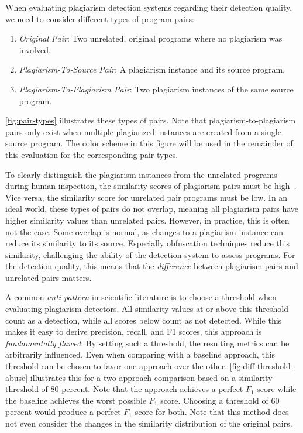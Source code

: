 When evaluating plagiarism detection systems regarding their detection quality, we need to consider different types of program pairs:
\begin{enumerate}
\item \textit{Original Pair}: Two unrelated, original programs where no plagiarism was involved.
\item \textit{Plagiarism-To-Source Pair}: A plagiarism instance and its source program.
\item \textit{Plagiarism-To-Plagiarism Pair}: Two plagiarism instances of the same source program.
\end{enumerate}
\autoref{fig:pair-types} illustrates these types of pairs. Note that plagiarism-to-plagiarism pairs only exist when multiple plagiarized instances are created from a single source program. The color scheme in this figure will be used in the remainder of this evaluation for the corresponding pair types.

To clearly distinguish the plagiarism instances from the unrelated programs during human inspection, the similarity scores of plagiarism pairs must be high~\cite{Saglam2024b}. Vice versa, the similarity score for unrelated pair programs must be low. In an ideal world, these types of pairs do not overlap, meaning all plagiarism pairs have higher similarity values than unrelated pairs. However, in practice, this is often not the case. Some overlap is normal, as changes to a plagiarism instance can reduce its similarity to its source. Especially obfuscation techniques reduce this similarity, challenging the ability of the detection system to assess programs.
For the detection quality, this means that the \textit{difference} between plagiarism pairs and unrelated pairs matters.

A common \textit{anti-pattern} in scientific literature is to choose a threshold when evaluating plagiarism detectors. All similarity values at or above this threshold count as a detection, while all scores below count as not detected. While this makes it easy to derive precision, recall, and F1 scores, this approach is \textit{fundamentally flawed}: By setting such a threshold, the resulting metrics can be arbitrarily influenced. Even when comparing with a baseline approach, this threshold can be chosen to favor one approach over the other.
\autoref{fig:diff-threshold-abuse} illustrates this for a two-approach comparison based on a similarity threshold of 80 percent.
Note that the approach achieves a perfect $F_1$ score while the baseline achieves the worst possible $F_1$ score. Choosing a threshold of 60 percent would produce a perfect $F_1$ score for both. Note that this method does not even consider the changes in the similarity distribution of the original pairs.


